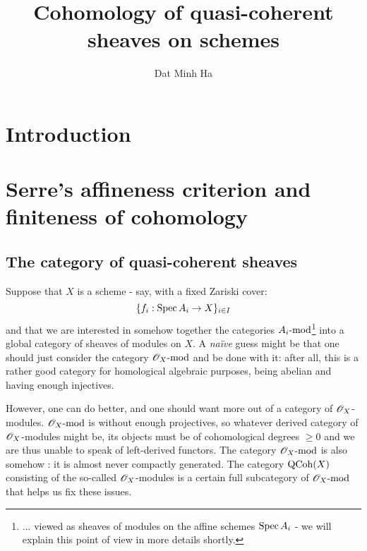 

\setcounter{section}{-1}





    \title{Cohomology of quasi-coherent sheaves on schemes}
    
    \author{Dat Minh Ha}
    \maketitle
    
    \begin{abstract}
        
    \end{abstract}
    
    {
      \hypersetup{} 
      \tableofcontents %
    }

    \section{Introduction}

    \section{Serre's affineness criterion and finiteness of cohomology}
        \subsection{The category of quasi-coherent sheaves}
            Suppose that $X$ is a scheme - say, with a fixed Zariski cover:
                $$\{ f_i: \Spec A_i \to X \}_{i \in I}$$
            and that we are interested in somehow  together the categories $A_i\mod$\footnote{... viewed as sheaves of modules on the affine schemes $\Spec A_i$ - we will explain this point of view in more details shortly.} into a global category of sheaves of modules on $X$. A \textit{na\"ive} guess might be that one should just consider the category $\scrO_X\mod$ and be done with it: after all, this is a rather good category for homological algebraic purposes, being abelian and having enough injectives.
            
            However, one can do better, and one should want more out of a category of $\scrO_X$-modules. $\scrO_X\mod$ is without enough projectives, so whatever  derived category of $\scrO_X$-modules might be, its objects must be of cohomological degrees $\geq 0$ and we are thus unable to speak of left-derived functors. The category $\scrO_X\mod$ is also somehow : it is almost never compactly generated. The category $\QCoh(X)$ consisting of the so-called  $\scrO_X$-modules is a certain full subcategory of $\scrO_X\mod$ that helps us fix these issues.

